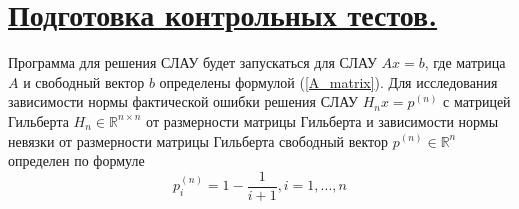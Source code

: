 \documentclass[a4paper, 12pt]{article}
\begin{document}
	\section{\underline{Подготовка контрольных тестов.}}
	
	Программа для решения СЛАУ будет запускаться для СЛАУ $Ax=b$, где матрица $A$ и свободный вектор $b$ определены формулой (\ref{A_matrix}). Для исследования зависимости нормы фактической ошибки решения СЛАУ $H_nx = p^{(n)}$ с матрицей Гильберта $H_n\in\mathbb{R}^{n\times n}$ от размерности матрицы Гильберта и зависимости нормы невязки от размерности матрицы Гильберта свободный вектор $p^{(n)}\in\mathbb{R}^n$ определен по формуле
	\begin{equation}
		\label{hilbert_vector}
		p_i^{(n)}=1-\frac{1}{i+1}, i=1,...,n
	\end{equation}
	
\end{document}
